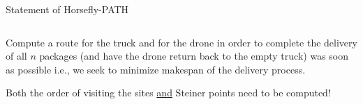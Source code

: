 \documentclass{beamer}
\begin{document}
\begin{frame}{Statement of Horsefly-PATH}
\begin{columns}
    \begin{column}{0.5\textwidth}
      \begin{center}
        Compute a route for the truck and for the drone in order to complete the delivery of
        all $n$ packages (and have the drone return back to the empty truck)
        was soon as possible i.e., we seek to {\color{red} minimize  makespan} of the delivery process.
        
        {\tiny Both the {\color{red} order} of visiting the sites \underline{and} {\color{red} Steiner points} need to be computed!}
        \end{center}
    \end{column}
    
  \end{columns}
\end{frame}


\end{document}
